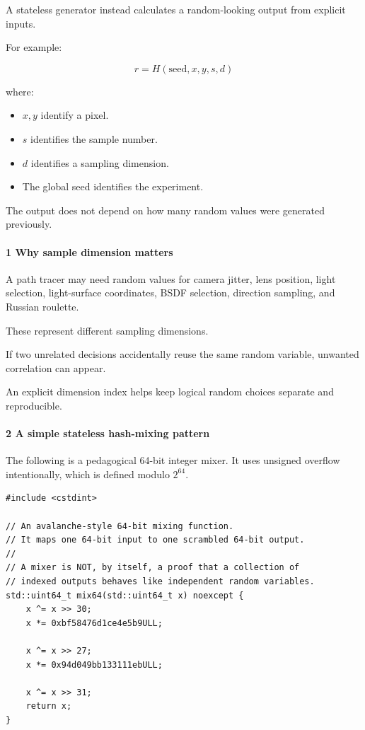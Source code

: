 A stateless generator instead calculates a random-looking output from explicit inputs.

For example:

\[
 \boxed{ r=H(\text{seed},x,y,s,d) }
\]

where:

\begin{itemize}
\tightlist
\item
  \(x,y\) identify a pixel.
\item
  \(s\) identifies the sample number.
\item
  \(d\) identifies a sampling dimension.
\item
  The global seed identifies the experiment.
\end{itemize}

The output does not depend on how many random values were generated previously.

\paragraph{1 Why sample dimension matters}\label{02-foundations-ii-ch029-why-sample-dimension-matters}

\hypertarget{02-foundations-ii-ch029-why-sample-dimension-matters}{}

A path tracer may need random values for camera jitter, lens position, light selection, light-surface coordinates, BSDF selection, direction sampling, and Russian roulette.

These represent different sampling dimensions.

If two unrelated decisions accidentally reuse the same random variable, unwanted correlation can appear.

An explicit dimension index helps keep logical random choices separate and reproducible.

\paragraph{2 A simple stateless hash-mixing pattern}\label{02-foundations-ii-ch029-a-simple-stateless-hash-mixing-pattern}

\hypertarget{02-foundations-ii-ch029-a-simple-stateless-hash-mixing-pattern}{}

The following is a pedagogical 64-bit integer mixer. It uses unsigned overflow intentionally, which is defined modulo \(2^{64}\).

\begin{verbatim}
#include <cstdint>

// An avalanche-style 64-bit mixing function.
// It maps one 64-bit input to one scrambled 64-bit output.
//
// A mixer is NOT, by itself, a proof that a collection of
// indexed outputs behaves like independent random variables.
std::uint64_t mix64(std::uint64_t x) noexcept {
    x ^= x >> 30;
    x *= 0xbf58476d1ce4e5b9ULL;

    x ^= x >> 27;
    x *= 0x94d049bb133111ebULL;

    x ^= x >> 31;
    return x;
}
\end{verbatim}

